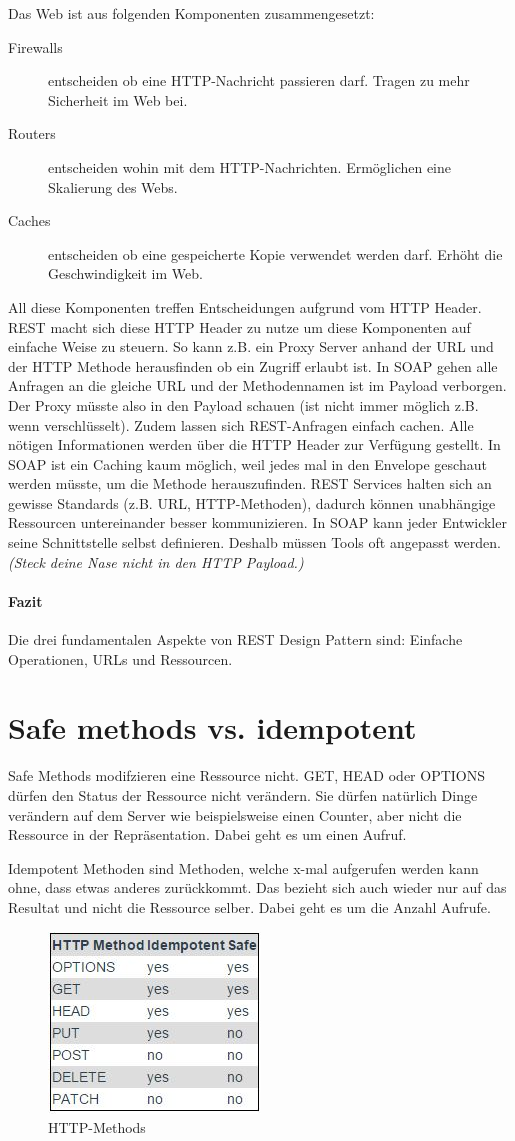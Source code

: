 Das Web ist aus folgenden Komponenten zusammengesetzt:
\begin{description}
	\item[Firewalls] entscheiden ob eine HTTP-Nachricht passieren darf. Tragen zu mehr Sicherheit im Web bei.
	\item[Routers] entscheiden wohin mit dem HTTP-Nachrichten. Ermöglichen eine Skalierung des Webs.
	\item[Caches] entscheiden ob eine gespeicherte Kopie verwendet werden darf. Erhöht die Geschwindigkeit im Web.
\end{description}
All diese Komponenten treffen Entscheidungen aufgrund vom HTTP Header. REST macht sich diese HTTP Header zu nutze um diese Komponenten auf einfache Weise zu steuern. So kann z.B. ein Proxy Server anhand der URL und der HTTP Methode herausfinden ob ein Zugriff erlaubt ist. In SOAP gehen alle Anfragen an die gleiche URL und der Methodennamen ist im Payload verborgen. Der Proxy müsste also in den Payload schauen (ist nicht immer möglich z.B. wenn verschlüsselt).
Zudem lassen sich REST-Anfragen einfach cachen. Alle nötigen Informationen werden über die HTTP Header zur Verfügung gestellt. In SOAP ist ein Caching kaum möglich, weil jedes mal in den Envelope geschaut werden müsste, um die Methode herauszufinden. 
REST Services halten sich an gewisse Standards (z.B. URL, HTTP-Methoden), dadurch können unabhängige Ressourcen untereinander besser kommunizieren. In SOAP kann jeder Entwickler seine Schnittstelle selbst definieren. Deshalb müssen Tools oft angepasst werden. \emph{(Steck deine Nase nicht in den HTTP Payload.)}

\paragraph{Fazit}
Die drei fundamentalen Aspekte von REST Design Pattern sind: Einfache Operationen, URLs und Ressourcen.

\section{Safe methods vs. idempotent}
Safe Methods modifzieren eine Ressource nicht. GET, HEAD oder OPTIONS dürfen den Status der Ressource nicht verändern. Sie dürfen natürlich Dinge verändern auf dem Server wie beispielsweise einen Counter, aber nicht die Ressource in der Repräsentation. Dabei geht es um einen Aufruf. 

Idempotent Methoden sind Methoden, welche x-mal aufgerufen werden kann ohne, dass etwas anderes zurückkommt. Das bezieht sich auch wieder nur auf das Resultat und nicht die Ressource selber. Dabei geht es um die Anzahl Aufrufe.

\begin{figure}[h!]
\centering
\includegraphics[width=0.5\linewidth]{fig/rest-methods}
\caption{HTTP-Methods}
\label{fig:rest-methods}
\end{figure}